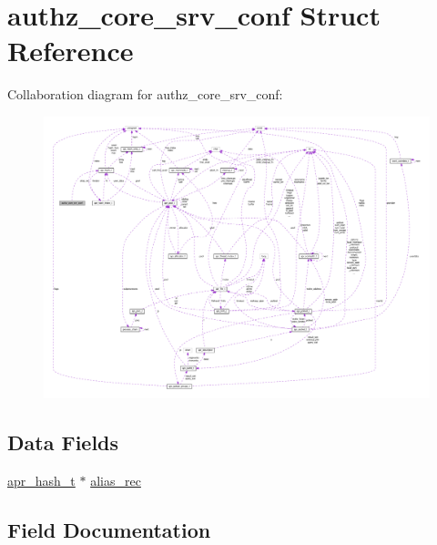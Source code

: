 \hypertarget{structauthz__core__srv__conf}{}\section{authz\+\_\+core\+\_\+srv\+\_\+conf Struct Reference}
\label{structauthz__core__srv__conf}


Collaboration diagram for authz\+\_\+core\+\_\+srv\+\_\+conf\+:
\nopagebreak
\begin{figure}[H]
\begin{center}
\leavevmode
\includegraphics[width=350pt]{structauthz__core__srv__conf__coll__graph}
\end{center}
\end{figure}
\subsection*{Data Fields}
\begin{DoxyCompactItemize}
\item 
\hyperlink{structapr__hash__t}{apr\+\_\+hash\+\_\+t} $\ast$ \hyperlink{structauthz__core__srv__conf_af97963b40a54cbbfcb038d49977b0cd2}{alias\+\_\+rec}
\end{DoxyCompactItemize}


\subsection{Field Documentation}
